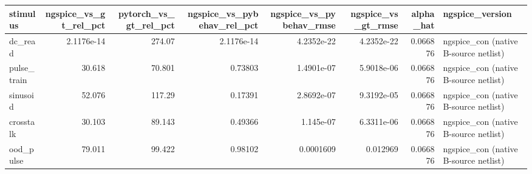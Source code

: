 \begin{tabular}{lrrrrrrl}
\toprule
stimulus & ngspice_vs_gt_rel_pct & pytorch_vs_gt_rel_pct & ngspice_vs_pybehav_rel_pct & ngspice_vs_pybehav_rmse & ngspice_vs_gt_rmse & alpha_hat & ngspice_version \\
\midrule
dc_read & 2.1176e-14 & 274.07 & 2.1176e-14 & 4.2352e-22 & 4.2352e-22 & 0.066876 & ngspice_con (native B-source netlist) \\
pulse_train & 30.618 & 70.801 & 0.73803 & 1.4901e-07 & 5.9018e-06 & 0.066876 & ngspice_con (native B-source netlist) \\
sinusoid & 52.076 & 117.29 & 0.17391 & 2.8692e-07 & 9.3192e-05 & 0.066876 & ngspice_con (native B-source netlist) \\
crosstalk & 30.103 & 89.143 & 0.49366 & 1.145e-07 & 6.3311e-06 & 0.066876 & ngspice_con (native B-source netlist) \\
ood_pulse & 79.011 & 99.422 & 0.98102 & 0.0001609 & 0.012969 & 0.066876 & ngspice_con (native B-source netlist) \\
\bottomrule
\end{tabular}
